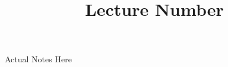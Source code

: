 \documentclass[20pt]{extarticle}
\title{Lecture Number}
\begin{document}
\maketitle

Actual Notes Here
\end{document}
